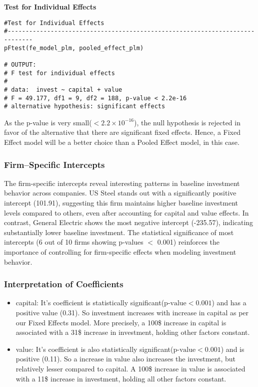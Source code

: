 \documentclass[a4paper]{article}
\begin{document}
\noindent\textbf{Test for Individual Effects}

\begin{lstlisting}[caption={R Code for Test for Individual Effects}]
#Test for Individual Effects
#-----------------------------------------------------------------------------
pFtest(fe_model_plm, pooled_effect_plm)

# OUTPUT:
# F test for individual effects
# 
# data:  invest ~ capital + value
# F = 49.177, df1 = 9, df2 = 188, p-value < 2.2e-16
# alternative hypothesis: significant effects
\end{lstlisting}

As the p-value is very small(\(<2.2\times10^{-16}\)), the null hypothesis is rejected in favor of the alternative that there are significant fixed effects. Hence, a Fixed Effect model will be a better choice than a Pooled Effect model, in this case.


\subsubsection*{\textbf{Firm--Specific Intercepts}}
The firm-specific intercepts reveal interesting patterns in baseline investment behavior across companies. US Steel stands out with a significantly positive intercept (101.91), suggesting this firm maintains higher baseline investment levels compared to others, even after accounting for capital and value effects. In contrast, General Electric shows the most negative intercept (-235.57), indicating substantially lower baseline investment. The statistical significance of most intercepts (6 out of 10 firms showing p-values \(<\) 0.001) reinforces the importance of controlling for firm-specific effects when modeling investment behavior.

\subsubsection*{\textbf{Interpretation of Coefficients}}
\begin{itemize}
    \item capital:  It's coefficient is statistically significant(\(\text{p-value}<0.001\)) and has a positive value (0.31). So investment increases with increase in capital as per our Fixed Effects model. More precisely, a 100\$ increase in capital is associated with a 31\$ increase in investment, holding other factors constant.
    
    \item value: It's coefficient is also statistically significant(\(\text{p-value}<0.001\)) and is positive (0.11). So a increase in value also increases the investment, but relatively lesser compared to capital. A 100\$ increase in value is associated with a 11\$ increase in investment, holding all other factors constant.

\end{itemize}
\end{document}
